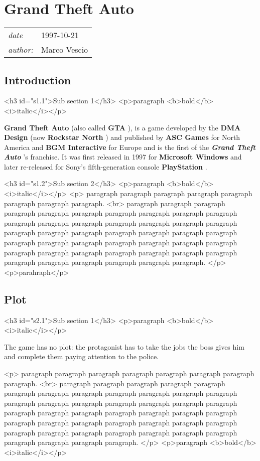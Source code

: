 \documentclass[a4paper,10pt]{book}
\newcommand{\pageHeader}[4]{
    \section{#1}
    \vspace{-0.3cm}
    \begin{table}[h!]
     \begin{tabular}{ll}
        \hline
        \textit{date} & #2 \\
        \textit{author: } & #3\\
        \hline
     \end{tabular}
    \end{table}
    \vspace{-0.3cm}
}
\begin{document}
 
 \newpage\pageHeader{Grand Theft Auto}{1997-10-21}{Marco Vescio}{A webpage about GTA}
 \subsection{Introduction }
 <h3 id="s1.1">Sub section 1</h3>
        <p>paragraph <b>bold</b> <i>italic</i></p> 
 
 \textbf{Grand Theft Auto }  (also called  \textbf{GTA } ), is a game developed by the  \textbf{DMA Design }  (now  \textbf{Rockstar North } ) and published by  \textbf{ASC Games }  for North America and  \textbf{BGM Interactive }  for Europe
        and is the first of the  \textbf{\textit{Grand Theft Auto }} 's franchise. It was first released in 1997 for  \textbf{Microsoft Windows }  and later re-released for Sony's fifth-generation console  \textbf{PlayStation } .
         
 <h3 id="s1.2">Sub section 2</h3>
        <p>paragraph <b>bold</b> <i>italic</i></p>
        <p>
          paragraph paragraph paragraph paragraph paragraph paragraph paragraph paragraph. <br>
          paragraph paragraph paragraph paragraph paragraph paragraph paragraph paragraph paragraph paragraph paragraph paragraph paragraph paragraph paragraph paragraph paragraph paragraph paragraph paragraph paragraph paragraph paragraph paragraph paragraph paragraph paragraph paragraph paragraph paragraph paragraph paragraph paragraph paragraph paragraph paragraph paragraph paragraph paragraph paragraph paragraph paragraph paragraph paragraph.
        </p>
        <p>parahraph</p> 
 \subsection{Plot }
 <h3 id="s2.1">Sub section 1</h3>
        <p>paragraph <b>bold</b> <i>italic</i></p> 
 
          The game has no plot: the protagonist has to take the jobs the boss gives him and complete them paying attention to the police.
         
 <p>
          paragraph paragraph paragraph paragraph paragraph paragraph paragraph paragraph. <br>
          paragraph paragraph paragraph paragraph paragraph paragraph paragraph paragraph paragraph paragraph paragraph paragraph paragraph paragraph paragraph paragraph paragraph paragraph paragraph paragraph paragraph paragraph paragraph paragraph paragraph paragraph paragraph paragraph paragraph paragraph paragraph paragraph paragraph paragraph paragraph paragraph paragraph paragraph paragraph paragraph paragraph paragraph paragraph paragraph.
        </p>
        <p>paragraph <b>bold</b> <i>italic</i></p> 
\end{document}
